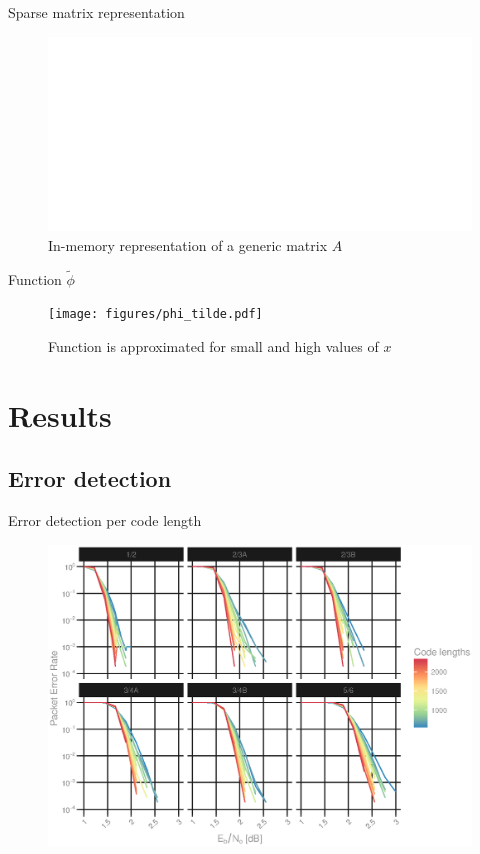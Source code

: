 \documentclass{beamer}
\begin{document}
\begin{darkframes}
  \begin{frame}{Sparse matrix representation}
    \begin{figure}[h]
      \centering
      \includegraphics[width=\textwidth]{figures/sparse-matrix.eps}
      \caption{In-memory representation of a generic matrix $A$}
      \label{fig:phi_tilde}
    \end{figure}
  \end{frame}


  \begin{frame}{Function $\tilde{\phi}$}
    \begin{figure}[h]
      \centering
      \texttt{[image: figures/phi\_tilde.pdf]}
      \vspace{-1cm}
      \caption{Function is approximated for small and high values of $x$}
      \label{fig:phi_tilde}
    \end{figure}
  \end{frame}

  \section{Results}
  \subsection{Error detection}
  \begin{frame}{Error detection per code length}
    \begin{figure}[h]
      \centering
      \includegraphics[width=\textwidth]{figures/Pe_vs_SNR_per_length.eps}
    \end{figure}
  \end{frame}


\end{darkframes}
\end{document}
